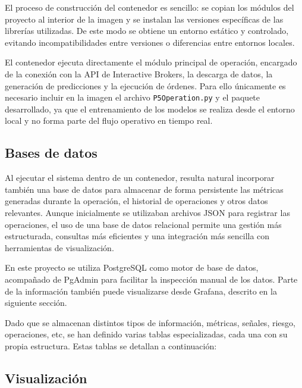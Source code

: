 El proceso de construcción del contenedor es sencillo: se copian los módulos del proyecto al interior de la imagen y se instalan las versiones
específicas de las librerías utilizadas. De este modo se obtiene un entorno estático y controlado, evitando incompatibilidades entre versiones o
diferencias entre entornos locales.

El contenedor ejecuta directamente el módulo principal de operación, encargado de la conexión con la API de Interactive Brokers, la descarga de datos,
la generación de predicciones y la ejecución de órdenes. Para ello únicamente es necesario incluir en la imagen el archivo \texttt{P5Operation.py} y
el paquete desarrollado, ya que el entrenamiento de los modelos se realiza desde el entorno local y no forma parte del flujo operativo en tiempo real.

\subsection{Bases de datos}

Al ejecutar el sistema dentro de un contenedor, resulta natural incorporar también una base de datos para almacenar de forma persistente las métricas
generadas durante la operación, el historial de operaciones y otros datos relevantes. Aunque inicialmente se utilizaban archivos JSON para registrar
las operaciones, el uso de una base de datos relacional permite una gestión más estructurada, consultas más eficientes y una integración más sencilla
con herramientas de visualización.

En este proyecto se utiliza PostgreSQL como motor de base de datos, acompañado de PgAdmin para facilitar la inspección manual de los datos. Parte de
la información también puede visualizarse desde Grafana, descrito en la siguiente sección.

Dado que se almacenan distintos tipos de información, métricas, señales, riesgo, operaciones, etc, se han definido varias tablas especializadas, cada
una con su propia estructura. Estas tablas se detallan a continuación:









\subsection{Visualización}

